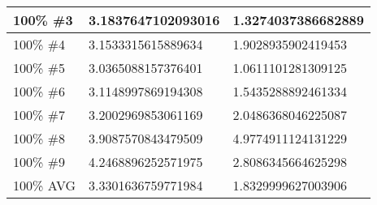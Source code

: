 \begin{longtable}{ | X | X | X | }
	100\% \#3 & 3.1837647102093016 & 1.3274037386682889 \\ \hline
	100\% \#4 & 3.1533315615889634 & 1.9028935902419453 \\ \hline
	100\% \#5 & 3.0365088157376401 & 1.0611101281309125 \\ \hline
	100\% \#6 & 3.1148997869194308 & 1.5435288892461334 \\ \hline
	100\% \#7 & 3.2002969853061169 & 2.0486368046225087 \\ \hline
	100\% \#8 & 3.9087570843479509 & 4.9774911124131229 \\ \hline
	100\% \#9 & 4.2468896252571975 & 2.8086345664625298 \\ \hline
	100\% AVG & 3.3301636759771984 & 1.8329999627003906 \\ \hline
\end{longtable}
